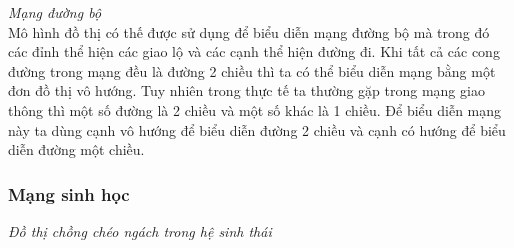 \textit{Mạng đường bộ} \\
Mô hình đồ thị có thế được sử dụng để biểu diễn mạng đường bộ mà trong đó các đỉnh 
thể hiện các giao lộ và các cạnh thể hiện đường đi. Khi tất cả các cong đường trong mạng 
đều là đường 2 chiều thì ta có thể biểu diễn mạng bằng một đơn đồ thị vô hướng. Tuy 
nhiên trong thực tế ta thường gặp trong mạng giao thông thì một số đường là 2 chiều
và một số khác là 1 chiều. Để biểu diễn mạng này ta dùng cạnh vô hướng để biểu diễn 
đường 2 chiều và cạnh có hướng để biểu diễn đường một chiều.

\subsubsection{Mạng sinh học}
\textit{Đồ thị chồng chéo ngách trong hệ sinh thái} \\
